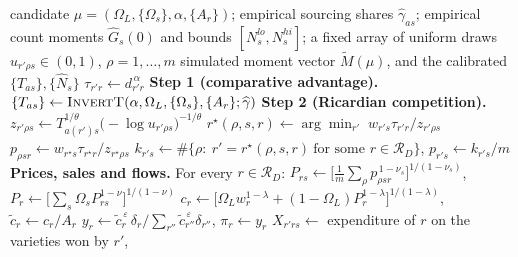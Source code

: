 \begin{algorithm}[H]
\caption{Simulation of the economy at a candidate $\mu$ (one criterion evaluation)}
\label{alg:simulate}
\begin{algorithmic}[1]
\Require candidate $\mu=(\Omega_L,\{\Omega_s\},\alpha,\{A_r\})$; empirical
  sourcing shares $\widehat{\gamma}_{as}$; empirical count moments
  $\widehat{G}_s(0)$ and bounds $[N^{lo}_s,N^{hi}_s]$; a fixed array of uniform
  draws $u_{r'\rho s}\in(0,1)$, $\rho=1,\dots,m$
\Ensure simulated moment vector $\widetilde{M}(\mu)$, and the calibrated
  $\{T_{as}\},\{\widehat{N}_s\}$
\vspace{2pt}
\State $\tau_{r'r}\gets d_{r'r}^{\,\alpha}$
\vspace{2pt}
\State \textbf{Step 1 (comparative advantage).}
  $\{T_{as}\}\gets\Call{InvertT}{\alpha,\Omega_L,\{\Omega_s\},\{A_r\};\widehat{\gamma}}$
\vspace{2pt}
\State \textbf{Step 2 (Ricardian competition).}
        \State $z_{r'\rho s}\gets T_{a(r')s}^{1/\theta}\bigl(-\log u_{r'\rho s}\bigr)^{-1/\theta}$
    \EndFor
        \State $r^\star(\rho,s,r)\gets\arg\min_{r'}\; w_{r's}\tau_{r'r}/z_{r'\rho s}$
        \State $p_{\rho s r}\gets w_{r^\star s}\tau_{r^\star r}/z_{r^\star\rho s}$
    \EndFor
\EndFor
\State $k_{r's}\gets\#\{\rho:\ r'=r^\star(\rho,s,r)\ \text{for some }r\in\mathcal{R}_D\}$,
  \quad $p_{r's}\gets k_{r's}/m$
\vspace{2pt}
\State \textbf{Prices, sales and flows.} For every $r\in\mathcal{R}_D$:
\State \quad $P_{rs}\gets\bigl[\tfrac1m\sum_{\rho}p_{\rho s r}^{\,1-\nu_s}\bigr]^{1/(1-\nu_s)}$,\quad
  $P_r\gets\bigl[\sum_s\Omega_s P_{rs}^{1-\nu}\bigr]^{1/(1-\nu)}$
\State \quad $c_r\gets\bigl[\Omega_L w_r^{1-\lambda}+(1-\Omega_L)P_r^{1-\lambda}\bigr]^{1/(1-\lambda)}$,\quad
  $\tilde c_r\gets c_r/A_r$
\State \quad $y_r\gets \tilde c_r^{\,\varepsilon}\,\delta_r\big/\sum_{r''}\tilde c_{r''}^{\,\varepsilon}\delta_{r''}$,\quad
  $\pi_r\gets y_r$
\State \quad $X_{r'rs}\gets$ expenditure of $r$ on the varieties won by $r'$,

\end{algorithmic}
\end{algorithm}
